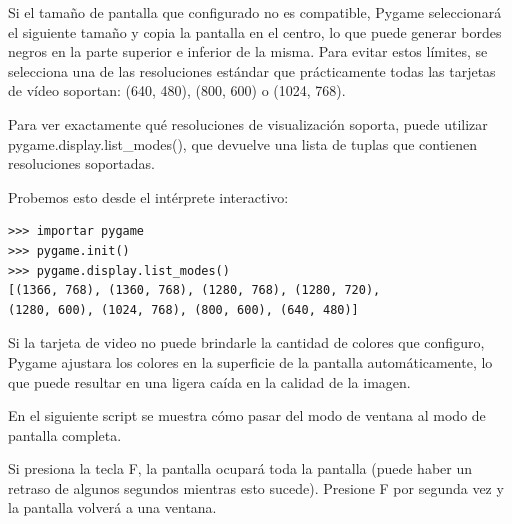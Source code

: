 Si el tamaño de pantalla que configurado no es compatible, Pygame seleccionará el siguiente tamaño y
copia la pantalla en el centro, lo que puede generar bordes negros en la parte superior e inferior de la misma. 
Para evitar estos límites, se selecciona una de las resoluciones estándar que prácticamente todas las tarjetas de vídeo soportan:
(640, 480), (800, 600) o (1024, 768). 

Para ver exactamente qué resoluciones  de visualización  soporta, puede utilizar {\ttfamily pygame.display.list\_modes()},
que devuelve una lista de tuplas que contienen resoluciones soportadas. 

Probemos esto desde el intérprete interactivo:
\begin{lstlisting}	
>>> importar pygame
>>> pygame.init()
>>> pygame.display.list_modes()
[(1366, 768), (1360, 768), (1280, 768), (1280, 720), 
(1280, 600), (1024, 768), (800, 600), (640, 480)]

\end{lstlisting}

Si la tarjeta de video no puede brindarle la cantidad de colores que configuro, Pygame ajustara
los colores en la superficie de la pantalla automáticamente, lo que puede resultar en una ligera caída en la calidad de la imagen.

En el siguiente {\ttfamily script} se muestra  cómo pasar del modo de ventana al modo de pantalla completa. 

Si presiona la tecla F, la pantalla ocupará toda la pantalla (puede haber un retraso de algunos
segundos mientras esto sucede). Presione F por segunda vez y la pantalla volverá a una ventana.

\hspace{-2.65cm}{\ttfamily \scriptsize pantalla}

